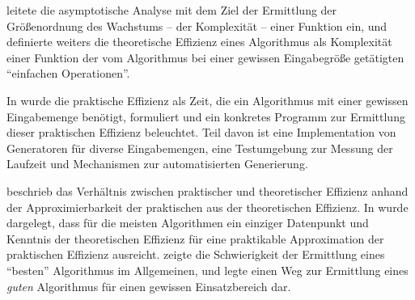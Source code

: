  leitete die asymptotische Analyse mit dem Ziel der Ermittlung der Größenordnung des Wachstums -- der Komplexität -- einer Funktion ein, und definierte weiters die theoretische Effizienz eines Algorithmus als Komplexität einer Funktion der vom Algorithmus bei einer gewissen Eingabegröße getätigten \enquote{einfachen Operationen}.

In  wurde die praktische Effizienz als Zeit, die ein Algorithmus mit einer gewissen Eingabemenge benötigt, formuliert und ein konkretes Programm zur Ermittlung dieser praktischen Effizienz beleuchtet. Teil davon ist eine Implementation von Generatoren für diverse Eingabemengen, eine Testumgebung zur Messung der Laufzeit und Mechanismen zur automatisierten Generierung.

 beschrieb das Verhältnis zwischen praktischer und theoretischer Effizienz anhand der Approximierbarkeit der praktischen aus der theoretischen Effizienz. In  wurde dargelegt, dass für die meisten Algorithmen ein einziger Datenpunkt und Kenntnis der theoretischen Effizienz für eine praktikable Approximation der praktischen Effizienz ausreicht.  zeigte die Schwierigkeit der Ermittlung eines \enquote{besten} Algorithmus im Allgemeinen, und legte einen Weg zur Ermittlung eines \emph{guten} Algorithmus für einen gewissen Einsatzbereich dar.

